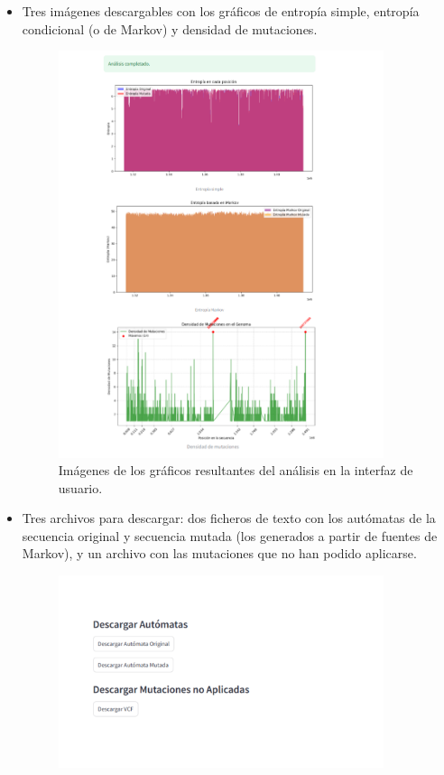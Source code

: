 \documentclass[11pt,spanish,listoffigures,listoftables]{tfgetsinf}
\begin{document}
\begin{itemize}
   \item Tres imágenes descargables con los gráficos de entropía simple, entropía condicional (o de Markov) y densidad de mutaciones. 
   \begin{figure}[H]
      \centering
      \includegraphics[width=0.9\textwidth]{Graficos_RP.png}
      \caption{Imágenes de los gráficos resultantes del análisis en la interfaz de usuario.}
      \label{fig:etiqueta_opcional9}
   \end{figure}
   \item Tres archivos para descargar: dos ficheros de texto con los autómatas de la secuencia original y secuencia mutada (los generados a partir de fuentes de Markov), y un archivo con las mutaciones que no han podido aplicarse. 
   \begin{figure}[H]
      \centering
      \includegraphics[width=0.9\textwidth]{Automatas_RP.png}

\end{figure}
\end{itemize}
\end{document}
